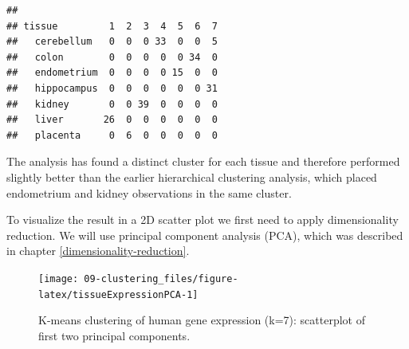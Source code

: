 \documentclass[]{book}
\newenvironment{Shaded}{\begin{snugshade}}{\end{snugshade}}
\newcommand{\KeywordTok}[1]{\textcolor[rgb]{0.13,0.29,0.53}{\textbf{{#1}}}}
\newcommand{\DataTypeTok}[1]{\textcolor[rgb]{0.13,0.29,0.53}{{#1}}}
\newcommand{\DecValTok}[1]{\textcolor[rgb]{0.00,0.00,0.81}{{#1}}}
\newcommand{\StringTok}[1]{\textcolor[rgb]{0.31,0.60,0.02}{{#1}}}
\newcommand{\NormalTok}[1]{{#1}}
\theoremstyle{definition}
\theoremstyle{definition}
\theoremstyle{definition}
\theoremstyle{remark}
\begin{document}
\begin{Shaded}
\end{Shaded}

\begin{verbatim}
##              
## tissue         1  2  3  4  5  6  7
##   cerebellum   0  0  0 33  0  0  5
##   colon        0  0  0  0  0 34  0
##   endometrium  0  0  0  0 15  0  0
##   hippocampus  0  0  0  0  0  0 31
##   kidney       0  0 39  0  0  0  0
##   liver       26  0  0  0  0  0  0
##   placenta     0  6  0  0  0  0  0
\end{verbatim}

The analysis has found a distinct cluster for each tissue and therefore
performed slightly better than the earlier hierarchical clustering
analysis, which placed endometrium and kidney observations in the same
cluster.

To visualize the result in a 2D scatter plot we first need to apply
dimensionality reduction. We will use principal component analysis
(PCA), which was described in chapter \ref{dimensionality-reduction}.

\begin{Shaded}
\end{Shaded}

\begin{figure}

{\centering \texttt{[image: 09-clustering\_files/figure-latex/tissueExpressionPCA-1]} 

}

\caption{K-means clustering of human gene expression (k=7): scatterplot of first two principal components.}\label{fig:tissueExpressionPCA}
\end{figure}
\end{document}
